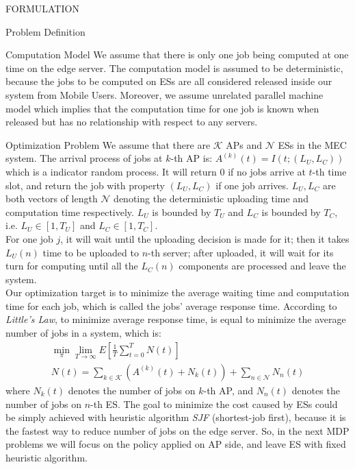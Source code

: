 \documentclass[10pt, conference, letterpaper]{IEEEtran}
\begin{document}
\begin{section}{FORMULATION}
\begin{subsection}{Problem Definition}
            \begin{subsubsection}{Computation Model}
                We assume that there is only one job being computed at one time on the edge server. The computation model is assumed to be deterministic, because the jobs to be computed on ESs are all considered released inside our system from Mobile Users.
                Moreover, we assume unrelated parallel machine model which implies that the computation time for one job is known when released but has no relationship with respect to any servers.
            \end{subsubsection}
            
            \begin{subsubsection}{Optimization Problem}
                We assume that there are $\mathcal{K}$ APs and $\mathcal{N}$ ESs in the MEC system.
                The arrival process of jobs at $k$-th AP is: $A^{(k)}(t)=I(t; (L_U, L_C))$ which is a indicator random process. It will return $0$ if no jobs arrive at $t$-th time slot, and return the job with property $(L_U, L_C)$ if one job arrives. $L_U, L_C$ are both vectors of length $\mathcal{N}$ denoting the deterministic uploading time and computation time respectively.
                $L_U$ is bounded by $T_U$ and $L_C$ is bounded by $T_C$, i.e. $L_U \in [1,T_U]$ and $L_C \in [1,T_C]$.
                \\
                For one job $j$, it will wait until the uploading decision is made for it; then it takes $L_U(n)$ time to be uploaded to $n$-th server; after uploaded, it will wait for its turn for computing until all the $L_C(n)$ components are processed and leave the system.
                \\
                Our optimization target is to minimize the average waiting time and computation time for each job, which is called the jobs' average response time. According to \emph{Little’s Law}, to minimize average response time, is equal to minimize the average number of jobs in a system, which is:
                \begin{gather}
                    \min_{\pi} \lim_{T \to \infty} E[\frac{1}{T} \sum_{t=0}^{T} N(t)]
                    \\
                    N(t) = \sum_{k \in \mathcal{K}} (A^{(k)}(t) + N_k(t))
                            + \sum_{n \in \mathcal{N}} N_n(t)
                \end{gather}
                where $N_k(t)$ denotes the number of jobs on $k$-th AP, and $N_n(t)$ denotes the number of jobs on $n$-th ES.
                The goal to minimize the cost caused by ESs could be simply achieved with heuristic algorithm \emph{SJF} (shortest-job first), because it is the fastest way to reduce number of jobs on the edge server. So, in the next MDP problems we will focus on the policy applied on AP side, and leave ES with fixed heuristic algorithm.
            \end{subsubsection}
        \end{subsection}


\end{section}
\end{document}
